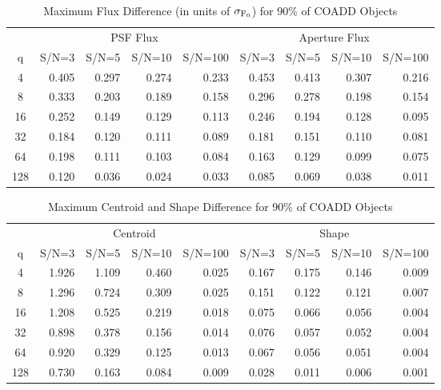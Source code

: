 \begin{table}[hb]
\caption{Maximum Flux Difference (in units of $\sigma_{\rm F_0}$) for 90\% of COADD Objects}
\centering
\begin{tabular}[]{c|rrrr|rrrr}
\hline
     &  \multicolumn{4}{c}{PSF Flux}  & \multicolumn{4}{c}{Aperture Flux} \\
 q   &  S/N=3 & S/N=5 & S/N=10 & S/N=100 & S/N=3 & S/N=5 & S/N=10 & S/N=100  \\
\hline
   4 & 0.405 & 0.297 & 0.274 &  0.233   &  0.453 & 0.413 & 0.307 &  0.216 \\
   8 & 0.333 & 0.203 & 0.189 &  0.158   &  0.296 & 0.278 & 0.198 &  0.154 \\
  16 & 0.252 & 0.149 & 0.129 &  0.113   &  0.246 & 0.194 & 0.128 &  0.095 \\
  32 & 0.184 & 0.120 & 0.111 &  0.089   &  0.181 & 0.151 & 0.110 &  0.081 \\
  64 & 0.198 & 0.111 & 0.103 &  0.084   &  0.163 & 0.129 & 0.099 &  0.075 \\
 128 & 0.120 & 0.036 & 0.024 &  0.033   &  0.085 & 0.069 & 0.038 &  0.011 \\
\hline
\end{tabular}
\label{tab_coadd_flux_diff}
\end{table}



\begin{table}
\caption{Maximum Centroid and Shape Difference for 90\% of COADD Objects}
\centering
\begin{tabular}[]{c|rrrr|rrrr}
\hline
     &  \multicolumn{4}{c}{Centroid}  & \multicolumn{4}{c}{Shape} \\
 q   &  S/N=3 & S/N=5 & S/N=10 & S/N=100 & S/N=3 & S/N=5 & S/N=10 & S/N=100  \\
\hline
   4 & 1.926 & 1.109 & 0.460 &  0.025   &  0.167 & 0.175 & 0.146 &  0.009 \\
   8 & 1.296 & 0.724 & 0.309 &  0.025   &  0.151 & 0.122 & 0.121 &  0.007 \\
  16 & 1.208 & 0.525 & 0.219 &  0.018   &  0.075 & 0.066 & 0.056 &  0.004 \\
  32 & 0.898 & 0.378 & 0.156 &  0.014   &  0.076 & 0.057 & 0.052 &  0.004 \\
  64 & 0.920 & 0.329 & 0.125 &  0.013   &  0.067 & 0.056 & 0.051 &  0.004 \\
 128 & 0.730 & 0.163 & 0.084 &  0.009   &  0.028 & 0.011 & 0.006 &  0.001 \\
\hline
\end{tabular}
\label{tab_coadd_cen_shape_diff}
\end{table}


